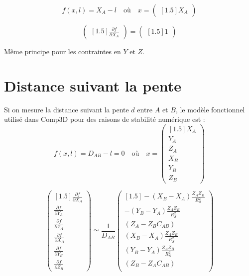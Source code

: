 \documentclass[french]{report}
\begin{document}
$$f(x,l) = X_A - l \quad \text{où} \quad x=
\begin{pmatrix}[1.5] X_A \end{pmatrix}$$

$$\begin{pmatrix}[1.5] \frac{\partial f}{\partial X_A} \end{pmatrix}
=\begin{pmatrix}[1.5] 1 \end{pmatrix}$$

Même principe pour les contraintes en $Y$ et $Z$.


\section{Distance suivant la pente}

Si on mesure la distance suivant la pente $d$ entre $A$ et $B$, le modèle fonctionnel utilisé dans Comp3D pour des raisons de stabilité numérique est :
$$ f(x,l)= D_{AB} - l = 0
\quad \text{où} \quad x=
\begin{pmatrix}[1.5] X_A\\ Y_A\\ Z_A\\ X_B\\ Y_B\\ Z_B \end{pmatrix}$$


$$\begin{pmatrix}[1.5]
\frac{\partial f}{\partial X_A}\\
\frac{\partial f}{\partial Y_A}\\
\frac{\partial f}{\partial Z_A}\\
\frac{\partial f}{\partial X_B}\\
\frac{\partial f}{\partial Y_B}\\
\frac{\partial f}{\partial Z_B} \end{pmatrix}
\simeq
\frac{1}{D_{AB}}
\begin{pmatrix}[1.5]
-(X_B-X_A) \frac{Z_A Z_B}{R_S^2}\\
-(Y_B-Y_A) \frac{Z_A Z_B}{R_S^2}\\
(Z_A-Z_B C_{AB})\\
(X_B-X_A) \frac{Z_A Z_B}{R_S^2}\\
(Y_B-Y_A) \frac{Z_A Z_B}{R_S^2}\\
(Z_B-Z_A C_{AB})\\
\end{pmatrix}$$
\end{document}
